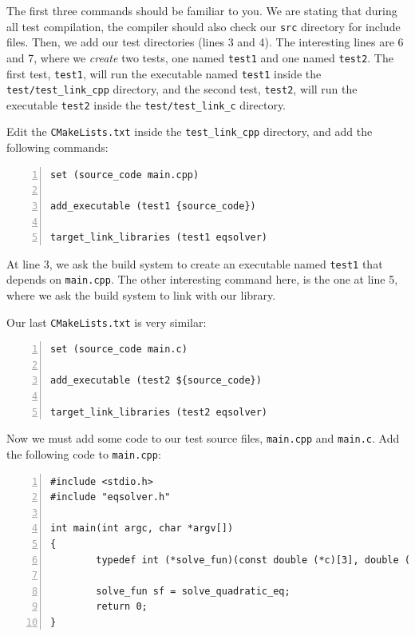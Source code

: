 \documentclass[12pt,a4paper]{article}
\begin{document}
The first three commands should be familiar to you. We are stating that during all test compilation, the compiler should also check our \verb+src+ directory for include files. Then, we add our test directories (lines 3 and 4). The interesting lines are 6 and 7, where we \emph{create} two tests, one named \verb+test1+ and one named \verb+test2+. The first test, \verb+test1+, will run the executable named \verb+test1+ inside the \verb+test/test_link_cpp+ directory, and the second test, \verb+test2+, will run the executable \verb+test2+ inside the \verb+test/test_link_c+ directory.

Edit the \verb+CMakeLists.txt+ inside the \verb+test_link_cpp+ directory, and add the following commands:
\begin{Verbatim}[numbers=left, frame=lines, label=file \texttt{eqsolver/test/test\_link\_cpp/CMakeLists.txt}]
set (source_code main.cpp)

add_executable (test1 {source_code})

target_link_libraries (test1 eqsolver)

\end{Verbatim}

At line 3, we ask the build system to create an executable named \verb+test1+ that depends on \verb+main.cpp+.
The other interesting command here, is the one at line 5, where we ask the build system to link with our library. 

Our last \verb+CMakeLists.txt+ is very similar:
\begin{Verbatim}[numbers=left, frame=lines, label=file \texttt{eqsolver/test/test\_link\_c/CMakeLists.txt}]
set (source_code main.c)

add_executable (test2 ${source_code})

target_link_libraries (test2 eqsolver)

\end{Verbatim}

Now we must add some code to our test source files, \verb+main.cpp+ and \verb+main.c+. Add the following code to \verb+main.cpp+:
\begin{lstlisting}[basicstyle=\small, numbers=left,caption=main.cpp,columns=flexible,keywordstyle=\color{black}\ttfamily]
#include <stdio.h>
#include "eqsolver.h"

int main(int argc, char *argv[])
{
        typedef int (*solve_fun)(const double (*c)[3], double (*r)[4]);

        solve_fun sf = solve_quadratic_eq;
        return 0;
}  
\end{lstlisting}
\end{document}
